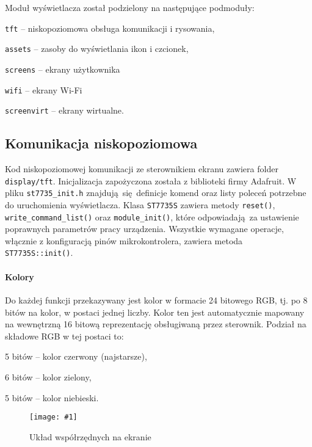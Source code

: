 \documentclass[polish]{aghengthesis}
\let\tempone\itemize
\let\temptwo\enditemize
\renewenvironment{itemize}{\tempone\setlength{\itemsep}{0cm}}{\temptwo}
\newcommand{\imgint}[4]{
	\begin{figure}[{#4}]
		\centering
		\texttt{[image: \#1]}
		\caption{#2}
		\label{#1}
	\end{figure}
}
\newcommand{\imgh}[3]{\imgint{#1}{#2}{#3}{H}}
\begin{document}
		\noindent
		Moduł wyświetlacza został podzielony na następujące podmoduły:
		\begin{itemize}
			\item \lstinline|tft| -- niskopoziomowa obsługa komunikacji i rysowania,
			\item \lstinline|assets| -- zasoby do wyświetlania ikon i czcionek,
			\item \lstinline|screens| -- ekrany użytkownika
			\begin{itemize}
				\item \lstinline|wifi| -- ekrany Wi-Fi
			\end{itemize}
			\item \lstinline|screenvirt| -- ekrany wirtualne.
		\end{itemize}
		
		\subsection{Komunikacja niskopoziomowa}
			Kod niskopoziomowej komunikacji ze sterownikiem ekranu zawiera folder \lstinline|display/tft|. Inicjalizacja zapożyczona została z biblioteki firmy Adafruit. W pliku \lstinline|st7735_init.h| znajdują się definicje komend oraz listy poleceń potrzebne do uruchomienia wyświetlacza. Klasa \lstinline|ST7735S| zawiera metody \lstinline|reset()|, \lstinline|write_command_list()| oraz \lstinline|module_init()|, które odpowiadają za ustawienie poprawnych parametrów pracy urządzenia. Wszystkie wymagane operacje, włącznie z konfiguracją pinów mikrokontrolera, zawiera metoda \lstinline|ST7735S::init()|.
			
		\paragraph{Kolory}
			Do każdej funkcji przekazywany jest kolor w formacie 24 bitowego RGB, tj. po 8 bitów na kolor, w postaci jednej liczby. Kolor ten jest automatycznie mapowany na wewnętrzną 16 bitową reprezentację obsługiwaną przez sterownik. Podział na składowe RGB w tej postaci to:
			\begin{itemize}
				\item 5 bitów -- kolor czerwony (najstarsze),
				\item 6 bitów -- kolor zielony,
				\item 5 bitów -- kolor niebieski.
			\end{itemize}
		
		\imgh{3/PicoRadio-screen-xy}{Układ współrzędnych na ekranie}{0.45}
\end{document}

